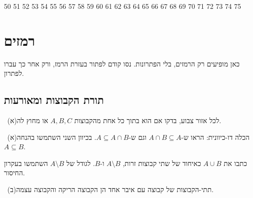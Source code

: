 \documentclass[12pt, a4paper]{article}
\begin{document}
\expandafter\def\csname qref@prob-013\endcsname{50}
\expandafter\def\csname qref@prob-014\endcsname{51}
\expandafter\def\csname qref@cond-005\endcsname{52}
\expandafter\def\csname qref@cond-006\endcsname{53}
\expandafter\def\csname qref@cond-007\endcsname{54}
\expandafter\def\csname qref@cond-008\endcsname{55}
\expandafter\def\csname qref@cond-009\endcsname{56}
\expandafter\def\csname qref@cond-001\endcsname{57}
\expandafter\def\csname qref@cond-002\endcsname{58}
\expandafter\def\csname qref@cond-010\endcsname{59}
\expandafter\def\csname qref@cond-011\endcsname{60}
\expandafter\def\csname qref@cond-012\endcsname{61}
\expandafter\def\csname qref@cond-013\endcsname{62}
\expandafter\def\csname qref@cond-014\endcsname{63}
\expandafter\def\csname qref@cond-015\endcsname{64}
\expandafter\def\csname qref@cond-016\endcsname{65}
\expandafter\def\csname qref@cond-018\endcsname{66}
\expandafter\def\csname qref@cond-004\endcsname{67}
\expandafter\def\csname qref@cond-021\endcsname{68}
\expandafter\def\csname qref@cond-022\endcsname{69}
\expandafter\def\csname qref@cond-023\endcsname{70}
\expandafter\def\csname qref@cond-024\endcsname{71}
\expandafter\def\csname qref@cond-025\endcsname{72}
\expandafter\def\csname qref@cond-026\endcsname{73}
\expandafter\def\csname qref@cond-027\endcsname{74}
\expandafter\def\csname qref@cond-028\endcsname{75}
\renewcommand{\qref}[1]{\ifcsname qref@#1\endcsname\csname qref@#1\endcsname\else\textenglish{#1}\fi}

\newpage
\section*{רמזים}
כאן מופיעים רק הרמזים, בלי הפתרונות. נסו קודם לפתור בעזרת הרמז, ורק אחר כך עברו לפתרון.


\subsection*{תורת הקבוצות ומאורעות}
\noindent {}\ (א)\enskip לכל אזור צבוע, בדקו אם הוא בתוך כל אחת מהקבוצות $A,B,C$ או מחוץ לה.\par\smallskip
\noindent {}\ (א)\enskip הכלה דו-כיוונית: הראו ש-$A\cap B\subseteq A$ וגם ש-$A\subseteq A\cap B$. בכיוון השני השתמשו בהנחה $A\subseteq B$.\par\smallskip
\noindent {}\enskip כתבו את $A\cup B$ כאיחוד של שתי קבוצות זרות, $A\setminus B$ ו-$B$. לגודל של $A\setminus B$ השתמשו בעקרון החיסור.\par\smallskip
\noindent {}\ (ב)\enskip תתי-הקבוצות של קבוצה עם איבר אחד הן הקבוצה הריקה והקבוצה עצמה.\par\smallskip
\end{document}
